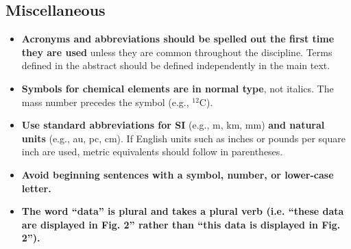 \documentclass[12pt]{article}
\begin{document}
\subsection{Miscellaneous}

\begin{itemize}

\item {\bf Acronyms and abbreviations should be spelled out the first
    time they are used} unless they are common throughout the
  discipline. Terms defined in the abstract should be defined
  independently in the main text.

\item {\bf Symbols for chemical elements are in normal type}, not
  italics. The mass number precedes the symbol (e.g., $^{12}$C).

\item {\bf Use standard abbreviations for SI} (e.g., m, km, mm) {\bf
    and natural units} (e.g., au, pc, cm). If English units such as
  inches or pounds per square inch are used, metric equivalents should
  follow in parentheses.

\item {\bf Avoid beginning sentences with a symbol, number, or
    lower-case letter.}

\item {\bf The word ``data'' is plural and takes a plural verb (i.e. ``these data are displayed in Fig. 2'' rather than ``this data is displayed in Fig. 2'').}

\end{itemize}
\end{document}
